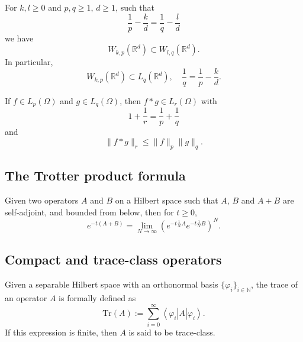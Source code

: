 \documentclass{ian}
\begin{document}
\label{theo:sobolev}
  For $k,l\geqslant 0$ and $p,q\geqslant 1$, $d\geqslant 1$, such that
  \begin{equation}
    \frac1p-\frac kd=\frac 1q-\frac ld
  \end{equation}
  we have
  \begin{equation}
    W_{k,p}(\mathbb R^d)\subset W_{l,q}(\mathbb R^d)
    .
  \end{equation}
  In particular,
  \nopagebreakaftereq
  \begin{equation}
    W_{k,p}(\mathbb R^d)\subset L_q(\mathbb R^d)
    ,\quad
    \frac1q=\frac 1p-\frac kd
    .
  \end{equation}
\endtheo
\restorepagebreakaftereq

\label{theo:young}
  If $f\in L_p(\Omega)$ and $g\in L_q(\Omega)$, then $f\ast g\in L_r(\Omega)$ with
  \begin{equation}
    1+\frac1r=\frac1p+\frac 1q
  \end{equation}
  and
  \nopagebreakaftereq
  \begin{equation}
    \|f\ast g\|_r\leqslant \|f\|_p\|g\|_q
    .
  \end{equation}
\endtheo
\restorepagebreakaftereq
\bigskip

\subsection{The Trotter product formula}
\label{theo:trotter}
  Given two operators $A$ and $B$ on a Hilbert space such that $A$, $B$ and $A+B$ are self-adjoint, and bounded from below, then for $t\geqslant 0$,
  \nopagebreakaftereq
  \begin{equation}
    e^{-t(A+B)}
    =
    \lim_{N\to\infty}\left(e^{-t\frac 1N A}e^{-t\frac1N B}\right)^N
    .
  \end{equation}
\endtheo
\restorepagebreakaftereq

\subsection{Compact and trace-class operators}\label{app:compact}
  Given a separable Hilbert space with an orthonormal basis $\{\varphi_i\}_{i\in\mathbb N}$, the trace of an operator $A$ is formally defined as
  \begin{equation}
    \mathrm{Tr}(A):=\sum_{i=0}^\infty \left<\varphi_i\right|A\left|\varphi_i\right>
    .
  \end{equation}
  If this expression is finite, then $A$ is said to be trace-class.
\endtheo
\bigskip
\end{document}
